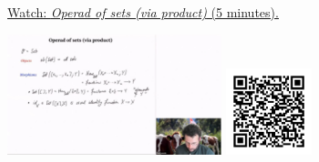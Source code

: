 
\begin{minipage}{10cm}
    \href{https://act4e-spring21.netlify.app/videos/spring2021-operads-a:operad-sets.html}{Watch: \emph{Operad of sets (via product)} (5 minutes).}
        
    \href{https://act4e-spring21.netlify.app/videos/spring2021-operads-a:operad-sets.html}{\includegraphics[height=3.5cm]{spring2021-operads-a:operad-sets/thumbnails.jpg}}
    \href{https://act4e-spring21.netlify.app/videos/spring2021-operads-a:operad-sets.html}{\includegraphics[height=2.5cm]{spring2021-operads-a:operad-sets/qrcode.png}}
\end{minipage}
